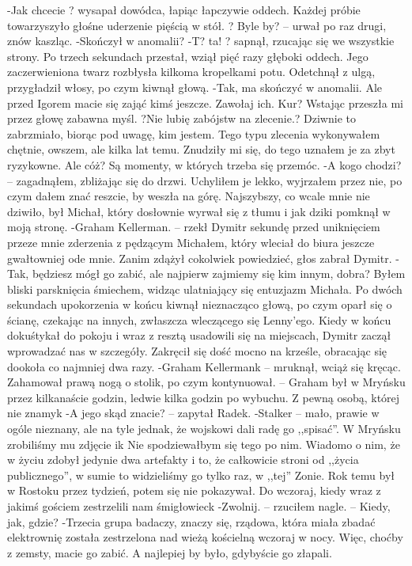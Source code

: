 \documentclass[../MAIN.tex]{subfiles}
\begin{document}
-Jak chcecie ? wysapał dowódca, łapiąc łapczywie oddech. Każdej próbie towarzyszyło głośne uderzenie pięścią w stół. ? Byle by? -- urwał po raz drugi, znów kaszląc.
-Skończył w anomalii?
-T? ta! ? sapnął, rzucając się we wszystkie strony. Po trzech sekundach przestał, wziął pięć razy głęboki oddech. Jego zaczerwieniona twarz rozbłysła kilkoma kropelkami potu. Odetchnął z ulgą, przygładził włosy, po czym kiwnął głową.
-Tak, ma skończyć w anomalii. Ale przed Igorem macie się zająć kimś jeszcze. Zawołaj ich.
Kur?
Wstając przeszła mi przez głowę zabawna myśl.
?Nie lubię zabójstw na zlecenie.? Dziwnie to zabrzmiało, biorąc pod uwagę, kim jestem. Tego typu zlecenia wykonywałem chętnie, owszem, ale kilka lat temu. Znudziły mi się, do tego uznałem je za zbyt ryzykowne.
Ale cóż? Są momenty, w których trzeba się przemóc.
-A kogo chodzi? -- zagadnąłem, zbliżając się do drzwi. Uchyliłem je lekko, wyjrzałem przez nie, po czym dałem znać reszcie, by weszła na górę. Najszybszy, co wcale mnie nie dziwiło, był Michał, który dosłownie wyrwał się z tłumu i jak dziki pomknął w moją stronę.
-Graham Kellerman. -- rzekł Dymitr sekundę przed uniknięciem przeze mnie zderzenia z pędzącym Michałem, który wleciał do biura jeszcze gwałtowniej ode mnie. Zanim zdążył cokolwiek powiedzieć, głos zabrał Dymitr.
-Tak, będziesz mógł go zabić, ale najpierw zajmiemy się kim innym, dobra?
Byłem bliski parsknięcia śmiechem, widząc ulatniający się entuzjazm Michała. Po dwóch sekundach upokorzenia w końcu kiwnął nieznacząco głową, po czym oparł się o ścianę, czekając na innych, zwłaszcza wleczącego się Lenny’ego.
Kiedy w końcu dokuśtykał do pokoju i wraz z resztą usadowili się na miejscach, Dymitr zaczął wprowadzać nas w szczegóły.
Zakręcił się dość mocno na krześle, obracając się dookoła co najmniej dwa razy.
-Graham Kellerman\3k -- mruknął, wciąż się kręcąc. Zahamował prawą nogą o stolik, po czym kontynuował. -- Graham był w Mryńsku przez kilkanaście godzin, ledwie kilka godzin po wybuchu. Z pewną osobą, której nie znamy\3k
-A jego skąd znacie? -- zapytał Radek.
-Stalker -- mało, prawie w ogóle nieznany, ale na tyle jednak, że wojskowi dali radę go ,,spisać''. W Mryńsku zrobiliśmy mu zdjęcie i\3k Nie spodziewałbym się tego po nim. Wiadomo o nim, że w życiu zdobył jedynie dwa artefakty i to, że całkowicie stroni od ,,życia publicznego'', w sumie to widzieliśmy go tylko raz, w ,,tej'' Zonie. Rok temu był w Rostoku przez tydzień, potem się nie pokazywał. Do wczoraj, kiedy wraz z jakimś gościem zestrzelili nam śmigłowiec\3k
-Zwolnij. -- rzuciłem nagle. -- Kiedy, jak, gdzie?
-Trzecia grupa badaczy, znaczy się, rządowa, która miała zbadać elektrownię została zestrzelona nad wieżą kościelną wczoraj w nocy. Więc, choćby z zemsty, macie go zabić. A najlepiej by było, gdybyście go złapali.
\end{document}
